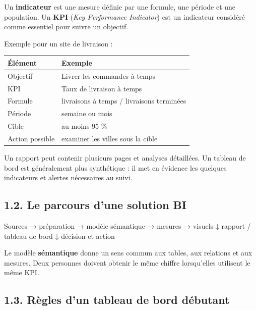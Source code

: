 \documentclass[
  french,
  letterpaper,
  open=any]{scrbook}
\newenvironment{Shaded}{\begin{snugshade}}{\end{snugshade}}
\newcommand{\NormalTok}[1]{\textcolor[rgb]{0.00,0.23,0.31}{#1}}
\newcounter{none} %
\theoremstyle{definition}
\theoremstyle{definition}
\theoremstyle{remark}
\begin{document}
Un \textbf{indicateur} est une mesure définie par une formule, une
période et une population. Un \textbf{KPI} (\emph{Key Performance
Indicator}) est un indicateur considéré comme essentiel pour suivre un
objectif.

Exemple pour un site de livraison :

{\def\LTcaptype{none} %
\begin{longtable}[]{@{}ll@{}}
\toprule\noalign{}
Élément & Exemple \\
\midrule\noalign{}
\endhead
\bottomrule\noalign{}
\endlastfoot
Objectif & Livrer les commandes à temps \\
KPI & Taux de livraison à temps \\
Formule & livraisons à temps / livraisons terminées \\
Période & semaine ou mois \\
Cible & au moins 95 \% \\
Action possible & examiner les villes sous la cible \\
\end{longtable}
}

Un rapport peut contenir plusieurs pages et analyses détaillées. Un
tableau de bord est généralement plus synthétique : il met en évidence
les quelques indicateurs et alertes nécessaires au suivi.

\subsection{1.2. Le parcours d'une solution
BI}\label{le-parcours-dune-solution-bi}

\begin{Shaded}
\begin{Highlighting}[]
\NormalTok{Sources → préparation → modèle sémantique → mesures → visuels}
\NormalTok{                                      ↓}
\NormalTok{                             rapport / tableau de bord}
\NormalTok{                                      ↓}
\NormalTok{                              décision et action}
\end{Highlighting}
\end{Shaded}

Le modèle \textbf{sémantique} donne un sens commun aux tables, aux
relations et aux mesures. Deux personnes doivent obtenir le même chiffre
lorsqu'elles utilisent le même KPI.

\subsection{1.3. Règles d'un tableau de bord
débutant}\label{ruxe8gles-dun-tableau-de-bord-duxe9butant}
\end{document}
